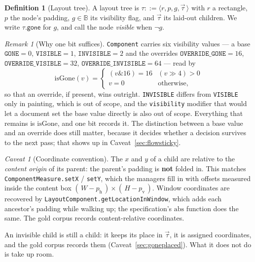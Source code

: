\documentclass[11pt,a4paper]{article}
\newcommand{\gone}{\mathsf{gone}}
\newcommand{\jv}[1]{\texttt{#1}}       %
\theoremstyle{definition}
\newtheorem{definition}{Definition}[section]
\theoremstyle{plain}
\theoremstyle{remark}
\newtheorem*{remark}{Remark}
\newtheorem{warning}{Caveat}[section]
\begin{document}
\begin{definition}[Layout tree]
A layout tree is
$\tau ::= \langle r, p, g, \vec{\tau}\,\rangle$ with $r$ a rectangle, $p$ the
node's padding, $g \in \mathbb{B}$ its visibility flag, and $\vec{\tau}$ its
laid-out children. We write $\tau.\gone$ for $g$, and call the node
\emph{visible} when $\neg g$.
\end{definition}

\begin{remark}[Why one bit suffices]
\jv{Component} carries six visibility values --- a base
$\jv{GONE} = 0$, $\jv{VISIBLE} = 1$, $\jv{INVISIBLE} = 2$ and the overrides
$\jv{OVERRIDE\_GONE} = 16$, $\jv{OVERRIDE\_VISIBLE} = 32$,
$\jv{OVERRIDE\_INVISIBLE} = 64$ --- read by
\[
  \mathrm{isGone}(v) = \begin{cases}
    (v \mathbin{\&} 16) = 16 & (v \gg 4) > 0 \\
    v = 0 & \text{otherwise,}
  \end{cases}
\]
so that an override, if present, wins outright. \jv{INVISIBLE} differs from
\jv{VISIBLE} only in painting, which is out of scope, and the \jv{visibility}
modifier that would let a document set the base value directly is also out of
scope. Everything that remains is $\mathrm{isGone}$, and one bit records it.
The distinction between a base value and an override does still matter, because
it decides whether a decision survives to the next pass; that shows up in
Caveat~\ref{sec:flowsticky}.
\end{remark}

\begin{warning}[Coordinate convention]
\label{sec:coords}
The $x$ and $y$ of a child are relative to the \emph{content origin} of its
parent: the parent's padding is \textbf{not} folded in. This matches
\jv{ComponentMeasure.setX} / \jv{setY}, which the managers fill in with offsets
measured inside the content box $(\,W - p_{\mathrm{h}}\,) \times (\,H -
p_{\mathrm{v}}\,)$. Window coordinates are recovered by
\jv{LayoutComponent.getLocationInWindow}, which adds each ancestor's padding
while walking up; the specification's $\mathrm{abs}$ function does the same.
The gold corpus records content-relative coordinates.
\end{warning}

An invisible child is still a child: it keeps its place in $\vec{\tau}$, it is
assigned coordinates, and the gold corpus records them
(Caveat~\ref{sec:goneplaced}). What it does not do is take up room.

\end{document}
